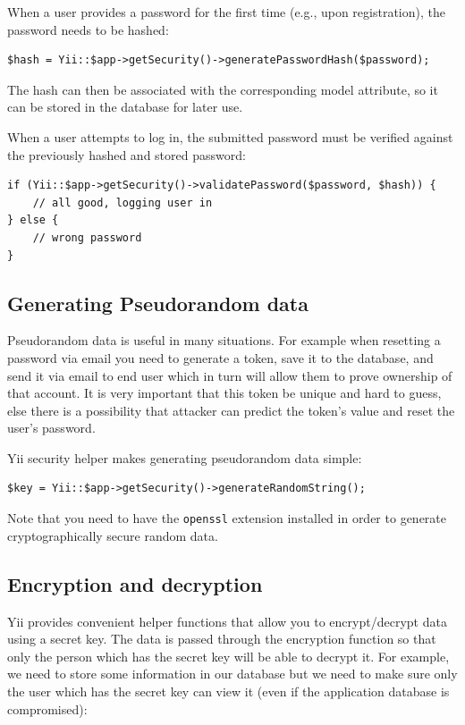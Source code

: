 When a user provides a password for the first time (e.g., upon registration), the password needs to be hashed:

\lstset{language=php}\begin{lstlisting}
$hash = Yii::$app->getSecurity()->generatePasswordHash($password);
\end{lstlisting}
The hash can then be associated with the corresponding model attribute, so it can be stored in the database for later use.

When a user attempts to log in, the submitted password must be verified against the previously hashed and stored password:

\lstset{language=php}\begin{lstlisting}
if (Yii::$app->getSecurity()->validatePassword($password, $hash)) {
    // all good, logging user in
} else {
    // wrong password
}
\end{lstlisting}
\subsection{Generating Pseudorandom data}
Pseudorandom data is useful in many situations. For example when resetting a password via email you need to generate a token, save it to the database, and send it via email to end user which in turn will allow them to prove ownership of that account. It is very important that this token be unique and hard to guess, else there is a possibility that attacker can predict the token's value and reset the user's password.

Yii security helper makes generating pseudorandom data simple:

\lstset{language=php}\begin{lstlisting}
$key = Yii::$app->getSecurity()->generateRandomString();
\end{lstlisting}
Note that you need to have the \lstinline|openssl| extension installed in order to generate cryptographically secure random data.

\subsection{Encryption and decryption}
Yii provides convenient helper functions that allow you to encrypt/decrypt data using a secret key. The data is passed through the encryption function so that only the person which has the secret key will be able to decrypt it.
For example, we need to store some information in our database but we need to make sure only the user which has the secret key can view it (even if the application database is compromised):

